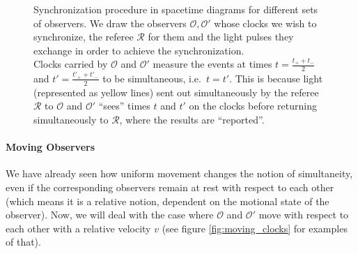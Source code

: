 \begin{figure}
\begin{minipage}{0.5\textwidth}
{
		}
	\end{minipage}%
	\begin{minipage}{0.5\textwidth}
		\caption{Synchronization procedure in spacetime diagrams for different sets of observers. We draw the observers $\mathcal{O}, \mathcal{O}'$ whose clocks we wish to synchronize, the referee $\mathcal{R}$ for them and the light pulses they exchange in order to achieve the synchronization.\\
		Clocks carried by $\mathcal{O}$ and $\mathcal{O}'$ measure the events at times $t = \frac{t_+ + t_-}{2}$ and $t' = \frac{t'_+ + t'_-}{2}$ to be simultaneous, i.e.~$t = t'$. This is because light (represented as yellow lines) sent out simultaneously by the referee $\mathcal{R}$ to $\mathcal{O}$ and $\mathcal{O}'$ \enquote{sees} times $t$ and $t'$ on the clocks before returning simultaneously to $\mathcal{R}$, where the results are \enquote{reported}.}
		\label{fig:clocks_at_rest_wrt_each_other}
	\end{minipage}
\end{figure}



			\paragraph{Moving Observers}
We have already seen how uniform movement changes the notion of simultaneity, even if the corresponding observers remain at rest with respect to each other (which means it is a relative notion, dependent on the motional state of the observer). Now, we will deal with the case where $\mathcal{O}$ and $\mathcal{O}'$ move with respect to each other with a relative velocity $v$ (see figure \ref{fig:moving_clocks} for examples of that).

